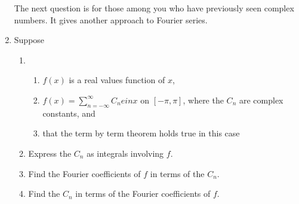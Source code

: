 \documentclass{article}
\begin{document}
\begin{enumerate}
The next question is for those among you who have previously seen complex numbers. It gives another approach to Fourier series.

\item Suppose
\begin{enumerate}
\item[] {}

\begin{enumerate}
\item $f(x)$ is a real values function of $x$,
\item $\displaystyle f(x) = \sum_{n=-\infty}^\infty C_ne{inx}$ on $[-\pi, \pi ]$, where the $C_n$ are complex constants, and
\item that the term by term theorem holds true in this case
\end{enumerate}


\item Express the $C_n$ as integrals involving $f$.
\item Find the Fourier coefficients of $f$ in terms of the $C_n$.
\item Find the $C_n$ in terms of the Fourier coefficients of $f$.
\end{enumerate}
\end{enumerate}
\end{document}
